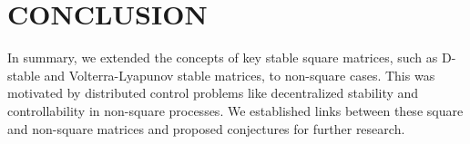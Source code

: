 \documentclass{article}
\begin{document}
\section{CONCLUSION}
In summary, we extended the concepts of key stable square matrices, such as D-stable and Volterra-Lyapunov stable matrices, to non-square cases. This was motivated by distributed control problems like decentralized stability and controllability in non-square processes. We established links between these square and non-square matrices and proposed conjectures for further research.



\end{document}
